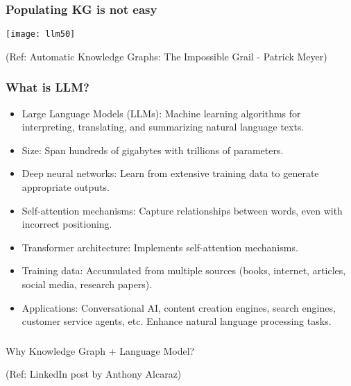 \begin{frame}[fragile]\frametitle{Populating KG is not easy}

\begin{center}
\texttt{[image: llm50]}
\end{center}

{\tiny (Ref: Automatic Knowledge Graphs: The Impossible Grail - Patrick Meyer)}

\end{frame}

\begin{frame}[fragile]\frametitle{What is LLM?}

\begin{itemize}
\item Large Language Models (LLMs): Machine learning algorithms for interpreting, translating, and summarizing natural language texts.
\item Size: Span hundreds of gigabytes with trillions of parameters.
\item Deep neural networks: Learn from extensive training data to generate appropriate outputs.
\item Self-attention mechanisms: Capture relationships between words, even with incorrect positioning.
\item Transformer architecture: Implements self-attention mechanisms.
\item Training data: Accumulated from multiple sources (books, internet, articles, social media, research papers).
\item Applications: Conversational AI, content creation engines, search engines, customer service agents, etc.
Enhance natural language processing tasks.
\end{itemize}

\end{frame}

\begin{frame}[fragile]\frametitle{}
\begin{center}
{\Large Why Knowledge Graph + Language Model?}

{\tiny (Ref: LinkedIn post by Anthony Alcaraz)}
\end{center}
\end{frame}


